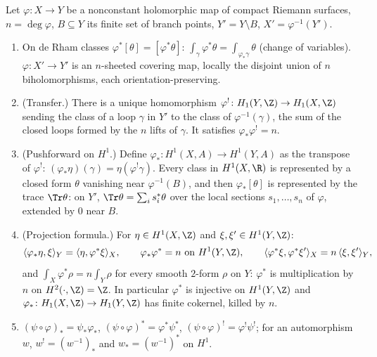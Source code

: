 \begin{proposition}\label{prop:curves:transfer}
Let $\varphi\colon X\to Y$ be a nonconstant holomorphic map of compact Riemann surfaces, $n=\deg\varphi$, $B\subseteq Y$ its finite set of branch points, $Y'=Y\setminus B$,
$X'=\varphi^{-1}(Y')$.
\begin{enumerate}[label=(\roman*)]
\item On de Rham classes $\varphi^*[\theta]=[\varphi^*\theta]$: $\int_\gamma\varphi^*\theta=\int_{\varphi_*\gamma}\theta$ (change of variables). $\varphi\colon X'\to Y'$ is an $n$-sheeted covering map,
locally the disjoint union of $n$ biholomorphisms, each orientation-preserving.
\item (Transfer.) There is a unique homomorphism $\varphi^!\colon H_1(Y,\Z)\to H_1(X,\Z)$ sending the class of a loop $\gamma$ in $Y'$ to the class of $\varphi^{-1}(\gamma)$, the sum of the
closed loops formed by the $n$ lifts of $\gamma$. It satisfies $\varphi_*\varphi^!=n$.
\item (Pushforward on $H^1$.) Define $\varphi_*\colon H^1(X,A)\to H^1(Y,A)$ as the transpose of $\varphi^!$: $(\varphi_*\eta)(\gamma)=\eta(\varphi^!\gamma)$. Every class in $H^1(X,\R)$ is
represented by a closed form $\theta$ vanishing near $\varphi^{-1}(B)$, and then $\varphi_*[\theta]$ is represented by the trace $\Tr\theta$: on $Y'$, $\Tr\theta=\sum_is_i^*\theta$ over the
local sections $s_1,\dots,s_n$ of $\varphi$, extended by $0$ near $B$.
\item (Projection formula.) For $\eta\in H^1(X,\Z)$ and $\xi,\xi'\in H^1(Y,\Z)$:
\[
\langle\varphi_*\eta,\xi\rangle_Y=\langle\eta,\varphi^*\xi\rangle_X,\qquad\varphi_*\varphi^*=n\text{ on }H^1(Y,\Z),\qquad\langle\varphi^*\xi,\varphi^*\xi'\rangle_X=n\,\langle\xi,\xi'\rangle_Y,
\]
and $\int_X\varphi^*\rho=n\int_Y\rho$ for every smooth $2$-form $\rho$ on $Y$: $\varphi^*$ is multiplication by $n$ on $H^2(\cdot,\Z)=\Z$. In particular $\varphi^*$ is injective on
$H^1(Y,\Z)$ and $\varphi_*\colon H_1(X,\Z)\to H_1(Y,\Z)$ has finite cokernel, killed by $n$.
\item $(\psi\circ\varphi)_*=\psi_*\varphi_*$, $(\psi\circ\varphi)^*=\varphi^*\psi^*$, $(\psi\circ\varphi)^!=\varphi^!\psi^!$; for an automorphism $w$, $w^!=(w^{-1})_*$ and $w_*=(w^{-1})^*$ on $H^1$.
\end{enumerate}
\end{proposition}

